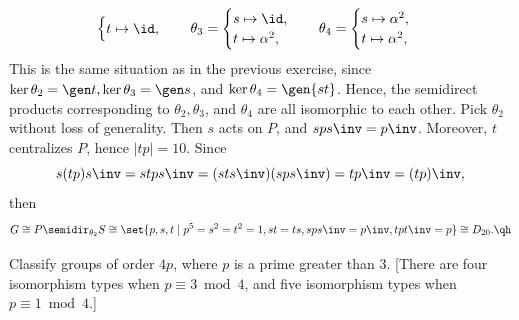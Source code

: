\begin{sol}
\begin{itemize}
\[\begin{cases}
            t \mapsto \id,
        \end{cases} \quad
        \theta_3 = 
        \begin{cases}
            s \mapsto \id, \\
            t \mapsto \alpha^2,
        \end{cases} \quad
        \theta_4 =
        \begin{cases}
            s \mapsto \alpha^2, \\
            t \mapsto \alpha^2,
        \end{cases}\]
        This is the same situation as in the previous exercise, since $\ker\theta_2 = \gen t, \ker\theta_3 = \gen s$, and $\ker\theta_4 = \gen{st}$. Hence, the semidirect products corresponding to $\theta_2, \theta_3$, and $\theta_4$ are all isomorphic to each other. Pick $\theta_2$ without loss of generality. Then $s$ acts on $P$, and $sps\inv = p\inv$. Moreover, $t$ centralizes $P$, hence $|tp| = 10$. Since
        \[s(tp)s\inv = stps\inv = (sts\inv)(sps\inv) = tp\inv = (tp)\inv,\]
        then
        \[G \cong P \semidir_{\theta_2} S \cong \set{p, s, t \mid p^5 = s^2 = t^2 = 1, st = ts, sps\inv = p\inv, tpt\inv = p} \cong D_{20}. \qh\]
    \end{itemize}
\end{sol}

\begin{exercise}\label{ex5.5.13}
    Classify groups of order $4p$, where $p$ is a prime greater than 3. [There are four isomorphism types when $p \equiv 3 \bmod 4$, and five isomorphism types when $p \equiv 1 \bmod 4$.]
\end{exercise}

